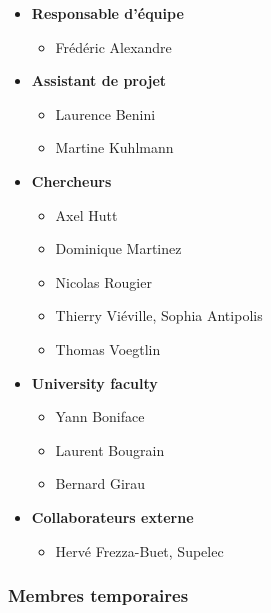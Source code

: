 \setlength{\columnseprule}{0.4pt}
\begin{multicols}{2}
\begin{itemize}
   \item \textbf{Responsable d'équipe}
      \begin{itemize}
         \item Frédéric Alexandre
      \end{itemize}
   \item \textbf{Assistant de projet}
      \begin{itemize}
         \item Laurence Benini
         \item Martine Kuhlmann 
      \end{itemize}
   \item \textbf{Chercheurs}
      \begin{itemize}
         \item Axel Hutt
         \item Dominique Martinez
         \item Nicolas Rougier
         \item Thierry Viéville, Sophia Antipolis
         \item Thomas Voegtlin 
      \end{itemize}
   \item \textbf{University faculty}
      \begin{itemize}
         \item Yann Boniface
         \item Laurent Bougrain
         \item Bernard Girau
      \end{itemize}
   \item \textbf{Collaborateurs externe}
      \begin{itemize}
         \item Hervé Frezza-Buet, Supelec
      \end{itemize}
\end{itemize}
\end{multicols}


\subsubsection{Membres temporaires} %
\label{ssub:Membres temporaires}

